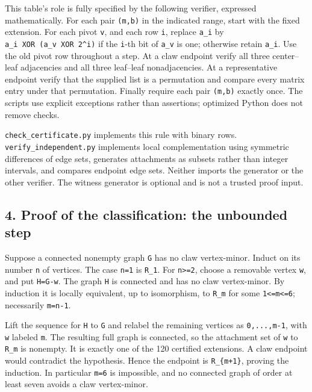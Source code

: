 \documentclass[
  11pt,
]{article}
\begin{document}
This table's role is fully specified by the following verifier,
expressed mathematically. For each pair \texttt{(m,b)} in the indicated
range, start with the fixed extension. For each pivot \texttt{v}, and
each row \texttt{i}, replace \texttt{a\_i} by
\texttt{a\_i\ XOR\ (a\_v\ XOR\ 2\^{}i)} if the \texttt{i}-th bit of
\texttt{a\_v} is one; otherwise retain \texttt{a\_i}. Use the old pivot
row throughout a step. At a claw endpoint verify all three center--leaf
adjacencies and all three leaf--leaf nonadjacencies. At a representative
endpoint verify that the supplied list is a permutation and compare
every matrix entry under that permutation. Finally require each pair
\texttt{(m,b)} exactly once. The scripts use explicit exceptions rather
than assertions; optimized Python does not remove checks.

\texttt{check\_certificate.py} implements this rule with binary rows.
\texttt{verify\_independent.py} implements local complementation using
symmetric differences of edge sets, generates attachments as subsets
rather than integer intervals, and compares endpoint edge sets. Neither
imports the generator or the other verifier. The witness generator is
optional and is not a trusted proof input.

\subsection{4. Proof of the classification: the unbounded
step}\label{proof-of-the-classification-the-unbounded-step}

Suppose a connected nonempty graph \texttt{G} has no claw vertex-minor.
Induct on its number \texttt{n} of vertices. The case \texttt{n=1} is
\texttt{R\_1}. For \texttt{n\textgreater{}=2}, choose a removable vertex
\texttt{w}, and put \texttt{H=G-w}. The graph \texttt{H} is connected
and has no claw vertex-minor. By induction it is locally equivalent, up
to isomorphism, to \texttt{R\_m} for some
\texttt{1\textless{}=m\textless{}=6}; necessarily \texttt{m=n-1}.

Lift the sequence for \texttt{H} to \texttt{G} and relabel the remaining
vertices as \texttt{0,...,m-1}, with \texttt{w} labeled \texttt{m}. The
resulting full graph is connected, so the attachment set of \texttt{w}
to \texttt{R\_m} is nonempty. It is exactly one of the 120 certified
extensions. A claw endpoint would contradict the hypothesis. Hence the
endpoint is \texttt{R\_\{m+1\}}, proving the induction. In particular
\texttt{m=6} is impossible, and no connected graph of order at least
seven avoids a claw vertex-minor.
\end{document}
